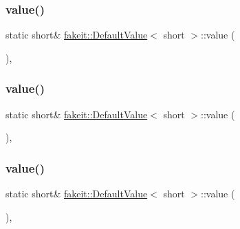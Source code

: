 \subsubsection{\texorpdfstring{value()}{value()}\hspace{0.1cm}{\footnotesize\ttfamily [1/9]}}
{\footnotesize\ttfamily static short\& \mbox{\hyperlink{structfakeit_1_1DefaultValue}{fakeit\+::\+Default\+Value}}$<$ short $>$\+::value (\begin{DoxyParamCaption}{ }\end{DoxyParamCaption})\hspace{0.3cm}{\ttfamily [inline]}, {\ttfamily [static]}}

\mbox{\label{structfakeit_1_1DefaultValue_3_01short_01_4_aabb09583ac063be72c6c142a770b8b34}} 
\subsubsection{\texorpdfstring{value()}{value()}\hspace{0.1cm}{\footnotesize\ttfamily [2/9]}}
{\footnotesize\ttfamily static short\& \mbox{\hyperlink{structfakeit_1_1DefaultValue}{fakeit\+::\+Default\+Value}}$<$ short $>$\+::value (\begin{DoxyParamCaption}{ }\end{DoxyParamCaption})\hspace{0.3cm}{\ttfamily [inline]}, {\ttfamily [static]}}

\mbox{\label{structfakeit_1_1DefaultValue_3_01short_01_4_aabb09583ac063be72c6c142a770b8b34}} 
\subsubsection{\texorpdfstring{value()}{value()}\hspace{0.1cm}{\footnotesize\ttfamily [3/9]}}
{\footnotesize\ttfamily static short\& \mbox{\hyperlink{structfakeit_1_1DefaultValue}{fakeit\+::\+Default\+Value}}$<$ short $>$\+::value (\begin{DoxyParamCaption}{ }\end{DoxyParamCaption})\hspace{0.3cm}{\ttfamily [inline]}, {\ttfamily [static]}}

